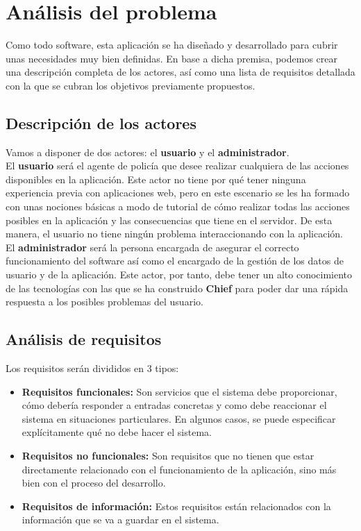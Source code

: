 \chapter{Análisis del problema}
 
 Como todo software, esta aplicación se ha diseñado y desarrollado para cubrir unas necesidades muy bien definidas. En base a dicha premisa, podemos crear una descripción completa de los 
 actores, así como una lista de requisitos detallada con la que se cubran los objetivos previamente
 propuestos.

\section{Descripción de los actores}
Vamos a disponer de dos actores: el \textbf{usuario} y el \textbf{administrador}.\\

El \textbf{usuario} será el agente de policía que desee realizar cualquiera de las acciones
disponibles en la aplicación. Este actor no tiene por qué tener ninguna experiencia previa
con aplicaciones web, pero en este escenario se les ha formado con unas nociones básicas 
a modo de tutorial de cómo realizar todas las acciones posibles en la aplicación y las consecuencias
que tiene en el servidor. De esta manera, el usuario no tiene ningún problema interaccionando con la aplicación.\\

El \textbf{administrador} será la persona encargada de asegurar el correcto funcionamiento 
del software así como el encargado de la gestión de los datos de usuario y de la aplicación. Este
actor, por tanto, debe tener un alto conocimiento de las tecnologías con las que se ha construido
\textbf{Chief} para poder dar una rápida respuesta a los posibles problemas del usuario.

\section{Análisis de requisitos}

Los requisitos serán divididos en 3 tipos:

\begin{itemize}
   \item \textbf{Requisitos funcionales:} Son servicios que el sistema debe proporcionar, cómo
   debería responder a entradas concretas y como debe reaccionar el sistema en situaciones 
   particulares. En algunos casos, se puede especificar explícitamente qué no debe hacer el sistema.\cite{software-engineering}

   \item \textbf{Requisitos no funcionales:} Son requisitos que no tienen que estar directamente relacionado
   con el funcionamiento de la aplicación, sino más bien con el proceso del desarrollo.
   
   \item \textbf{Requisitos de información:} Estos requisitos están relacionados con la información 
   que se va a guardar en el sistema.
\end{itemize}

